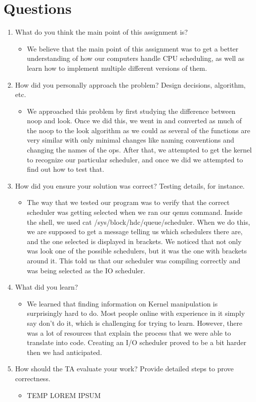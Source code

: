 \documentclass[journal,10pt,onecolumn,compsoc]{IEEEtran} \usepackage[margin=1.0in]{geometry} \usepackage{pdfpages}
\begin{document}
\section {Questions}
\begin {enumerate}
\item What do you think the main point of this assignment is?
	\begin{itemize}
    	\item We believe that the main point of this assignment was to get a better understanding of how our computers handle CPU scheduling, as well as learn how to implement multiple different versions of them.
    \end{itemize}
\item How did you personally approach the problem? Design decisions, algorithm, etc.
	\begin{itemize}
    	\item We approached this problem by first studying the difference between noop and look. Once we did this, we went in and converted as much of the noop to the look algorithm as we could as several of the functions are very similar with only minimal changes like naming conventions and changing the names of the ops. After that, we attempted to get the kernel to recognize our particular scheduler, and once we did we attempted to find out how to test that.
    \end{itemize}
\item How did you ensure your solution was correct? Testing details, for instance.
	\begin{itemize}
    	\item The way that we tested our program was to verify that the correct scheduler was getting selected when we ran our qemu command. Inside the shell, we used cat /sys/block/hdc/queue/scheduler. When we do this, we are supposed to get a message telling us which schedulers there are, and the one selected is displayed in brackets. We noticed that not only was look one of the possible schedulers, but it was the one with brackets around it. This told us that our scheduler was compiling correctly and was being selected as the IO scheduler. 
    \end{itemize}
\item What did you learn?
	\begin{itemize}
    	\item We learned that finding information on Kernel manipulation is surprisingly hard to do. Most people online with experience in it simply say don't do it, which is challenging for trying to learn. However, there was a lot of resources that explain the process that we were able to translate into code. Creating an I/O scheduler proved to be a bit harder then we had anticipated.  
    \end{itemize}
\item How should the TA evaluate your work? Provide detailed steps to prove correctness.
	\begin{itemize}
    	\item TEMP LOREM IPSUM
    \end{itemize}

\end{enumerate}
\end{document}
